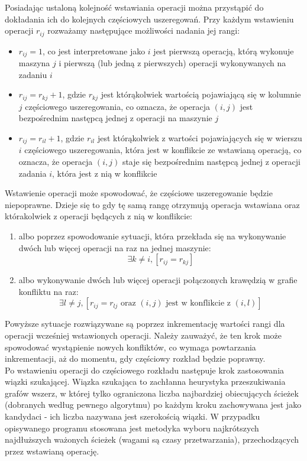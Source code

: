 \documentclass[brudnopis]{xmgr}
\begin{document}
Posiadając ustaloną kolejność wstawiania operacji można przystąpić do dokładania ich do kolejnych częściowych uszeregowań. Przy każdym wstawieniu operacji $r_{ij}$ rozważamy następujące możliwości nadania jej rangi:
\begin{itemize}
    \item $r_{ij} = 1$, co jest interpretowane jako $i$ jest pierwszą operacją, którą wykonuje maszyna $j$ i pierwszą (lub jedną z pierwszych) operacji wykonywanych na zadaniu $i$
    \item $r_{ij} = r_{kj} + 1$, gdzie $r_{kj}$ jest którąkolwiek wartością pojawiającą się w kolumnie $j$ częściowego uszeregowania, co oznacza, że operacja $(i,j)$ jest bezpośrednim następcą jednej z operacji na maszynie $j$
    \item $r_{ij} = r_{il} + 1$, gdzie $r_{il}$ jest którąkolwiek z wartości pojawiających się w wierszu $i$ częściowego uszeregowania, która jest w konflikcie ze wstawianą operacją, co oznacza, że operacja $(i,j)$ staje się bezpośrednim następcą jednej z operacji zadania $i$, która jest z nią w konflikcie
\end{itemize}

Wstawienie operacji może spowodować, że częściowe uszeregowanie będzie niepoprawne. Dzieje się to gdy tę samą rangę otrzymują operacja wstawiana oraz którakolwiek z operacji będących z nią w konflikcie:
\begin{enumerate}
    \item albo poprzez spowodowanie sytuacji, która przekłada się na wykonywanie dwóch lub więcej operacji na raz na jednej maszynie:
    $$\exists k \neq i, [r_{ij}=r_{kj}]$$
    \item albo wykonywanie dwóch lub więcej operacji połączonych krawędzią w grafie konfliktu na raz:
    $$\exists l \neq j, [r_{ij}=r_{lj} \textrm{ oraz } (i,j) \textrm{ jest w konflikcie z } (i,l)]$$
\end{enumerate}
 
 Powyższe sytuacje rozwiązywane są poprzez inkrementację wartości rangi dla operacji wcześniej wstawionych operacji. Należy zauważyć, że ten krok może spowodować wystąpienie nowych konfliktów, co wymaga powtarzania inkrementacji, aż do momentu, gdy częściowy rozkład będzie poprawny.\\
 
 Po wstawieniu operacji do częściowego rozkładu następuje krok zastosowania wiązki szukającej.
 Wiązka szukająca to zachłanna heurystyka przeszukiwania grafów wszerz, w której tylko ograniczona liczba najbardziej obiecujących ścieżek (dobranych według pewnego algorytmu) po każdym kroku zachowywana jest jako kandydaci - ich liczba nazywana jest szerokością wiązki.
 W przypadku opisywanego programu stosowana jest metodyka wyboru najkrótszych najdłuższych ważonych ścieżek (wagami są czasy przetwarzania), przechodzących przez wstawianą operację.
 
\end{document}
